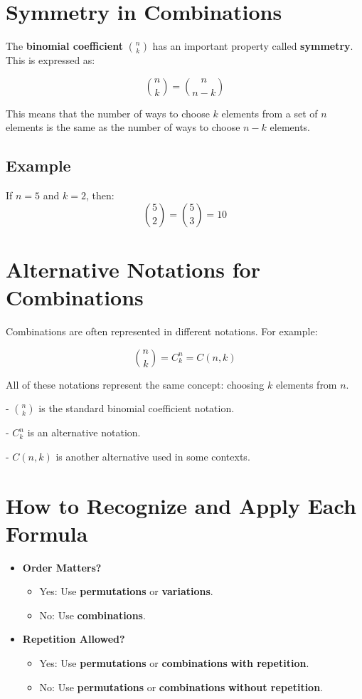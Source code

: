 \documentclass{article}
\begin{document}
\newpage
\section{Symmetry in Combinations}

The \textbf{binomial coefficient} \(\binom{n}{k}\) has an important property called \textbf{symmetry}. This is expressed as:

\[
\binom{n}{k} = \binom{n}{n-k}
\]

This means that the number of ways to choose \(k\) elements from a set of \(n\) elements is the same as the number of ways to choose \(n-k\) elements.

\subsection{Example}
If \(n = 5\) and \(k = 2\), then:
\[
\binom{5}{2} = \binom{5}{3} = 10
\]

\newpage
\section{Alternative Notations for Combinations}

Combinations are often represented in different notations. For example:

\[
\binom{n}{k} = C_k^n = C(n, k)
\]

All of these notations represent the same concept: choosing \(k\) elements from \(n\).

- \(\binom{n}{k}\) is the standard binomial coefficient notation.

- \(C_k^n\) is an alternative notation.

- \(C(n, k)\) is another alternative used in some contexts.

\newpage
\section{How to Recognize and Apply Each Formula}

\begin{itemize}
  \item \textbf{Order Matters?} 
    \begin{itemize}
      \item Yes: Use \textbf{permutations} or \textbf{variations}.
      \item No: Use \textbf{combinations}.
    \end{itemize}
  \item \textbf{Repetition Allowed?}
    \begin{itemize}
      \item Yes: Use \textbf{permutations} or \textbf{combinations} \textbf{with repetition}.
      \item No: Use \textbf{permutations} or \textbf{combinations} \textbf{without repetition}.
    \end{itemize}
\end{itemize}
\end{document}
